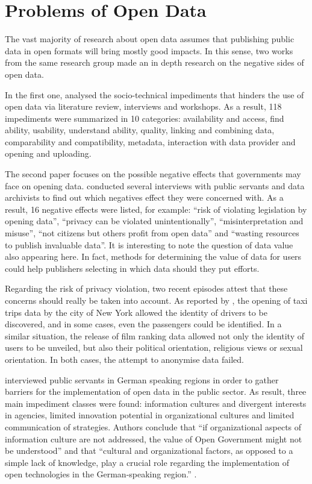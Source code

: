 
\section{Problems of Open Data}
\label{sec:problems}

The vast majority of research about open data assumes that publishing public data in open formats will bring mostly good impacts.
In this sense, two works from the same research group made an in depth research on the negative sides of open data.

In the first one,  analysed the socio-technical impediments that hinders the use of open data via literature review, interviews and workshops.
As a result, 118 impediments were summarized in 10 categories: availability and access, find ability, usability, understand ability, quality, linking and combining data, comparability and compatibility, metadata, interaction with data provider and opening and uploading.

The second paper focuses on the possible negative effects that governments may face on opening data.  conducted several interviews with public servants and data archivists to find out which negatives effect they were concerned with.
As a result, 16 negative effects were listed, for example: ``risk of violating legislation by opening data'', ``privacy can be violated unintentionally'', ``misinterpretation and misuse'', ``not citizens but others profit from open data'' and ``wasting resources to publish invaluable data''.
It is interesting to note the question of data value also appearing here.
In fact, methods for determining the value of data for users could help publishers selecting in which data should they put efforts.

Regarding the risk of privacy violation, two recent episodes attest that these concerns should really be taken into account.
As reported by , the opening of taxi trips data by the city of New York allowed the identity of drivers to be discovered, and in some cases, even the passengers could be identified.
In a similar situation, the release of film ranking data allowed not only the identity of users to be unveiled, but also their political orientation, religious views or sexual orientation.
In both cases, the attempt to anonymise data failed.

 interviewed public servants in German speaking regions in order to gather barriers for the implementation of open data in the public sector.
As result, three main impediment classes were found: information cultures and divergent interests in agencies, limited innovation potential in organizational cultures and limited communication of strategies.
Authors conclude that ``if organizational aspects of information culture are not addressed, the value of Open Government might not be understood'' and that ``cultural and organizational factors, as opposed to a simple lack of knowledge, play a crucial role regarding the implementation of open technologies in the German-speaking region.'' \cite[p.7]{Parycek2016}.

